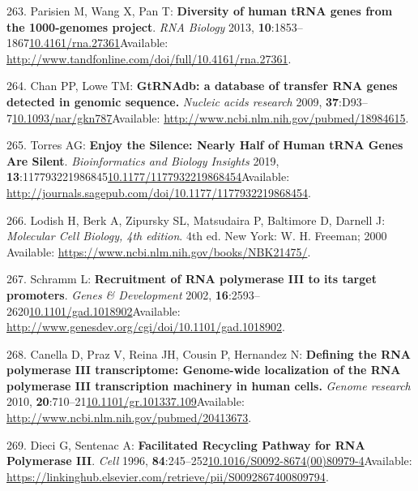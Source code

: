 \documentclass[
]{book}
\begin{document}
\leavevmode\hypertarget{ref-Parisien2013}{}%
263. Parisien M, Wang X, Pan T: \textbf{Diversity of human tRNA genes from the 1000-genomes project}. \emph{RNA Biology} 2013, \textbf{10}:1853--1867\href{https://doi.org/10.4161/rna.27361}{10.4161/rna.27361}Available: \url{http://www.tandfonline.com/doi/full/10.4161/rna.27361}.

\leavevmode\hypertarget{ref-Chan2009}{}%
264. Chan PP, Lowe TM: \textbf{GtRNAdb: a database of transfer RNA genes detected in genomic sequence.} \emph{Nucleic acids research} 2009, \textbf{37}:D93--7\href{https://doi.org/10.1093/nar/gkn787}{10.1093/nar/gkn787}Available: \url{http://www.ncbi.nlm.nih.gov/pubmed/18984615}.

\leavevmode\hypertarget{ref-Torres2019a}{}%
265. Torres AG: \textbf{Enjoy the Silence: Nearly Half of Human tRNA Genes Are Silent}. \emph{Bioinformatics and Biology Insights} 2019, \textbf{13}:117793221986845\href{https://doi.org/10.1177/1177932219868454}{10.1177/1177932219868454}Available: \url{http://journals.sagepub.com/doi/10.1177/1177932219868454}.

\leavevmode\hypertarget{ref-Lodish2000}{}%
266. Lodish H, Berk A, Zipursky SL, Matsudaira P, Baltimore D, Darnell J: \emph{Molecular Cell Biology, 4th edition}. 4th ed. New York: W. H. Freeman; 2000 Available: \url{https://www.ncbi.nlm.nih.gov/books/NBK21475/}.

\leavevmode\hypertarget{ref-Schramm2002}{}%
267. Schramm L: \textbf{Recruitment of RNA polymerase III to its target promoters}. \emph{Genes \& Development} 2002, \textbf{16}:2593--2620\href{https://doi.org/10.1101/gad.1018902}{10.1101/gad.1018902}Available: \url{http://www.genesdev.org/cgi/doi/10.1101/gad.1018902}.

\leavevmode\hypertarget{ref-Canella2010}{}%
268. Canella D, Praz V, Reina JH, Cousin P, Hernandez N: \textbf{Defining the RNA polymerase III transcriptome: Genome-wide localization of the RNA polymerase III transcription machinery in human cells.} \emph{Genome research} 2010, \textbf{20}:710--21\href{https://doi.org/10.1101/gr.101337.109}{10.1101/gr.101337.109}Available: \url{http://www.ncbi.nlm.nih.gov/pubmed/20413673}.

\leavevmode\hypertarget{ref-Dieci1996}{}%
269. Dieci G, Sentenac A: \textbf{Facilitated Recycling Pathway for RNA Polymerase III}. \emph{Cell} 1996, \textbf{84}:245--252\href{https://doi.org/10.1016/S0092-8674(00)80979-4}{10.1016/S0092-8674(00)80979-4}Available: \url{https://linkinghub.elsevier.com/retrieve/pii/S0092867400809794}.
\end{document}
